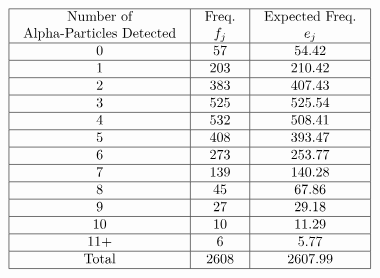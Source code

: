 \[ \begin{array}{|c|c|c|}
        \hline \begin{array}{c}
            \text{Number of} \\
            \text{Alpha-Particles Detected}
        \end{array} & \begin{array}{c}
            \text{Freq.} \\
            f_{j}
        \end{array} & \begin{array}{c}
            \text{Expected Freq.} \\
            e_{j}
        \end{array} \\
        \hline 0                          & 57                         & 54.42                      \\
        \hline 1                          & 203                        & 210.42                     \\
        \hline 2                          & 383                        & 407.43                     \\
        \hline 3                          & 525                        & 525.54                     \\
        \hline 4                          & 532                        & 508.41                     \\
        \hline 5                          & 408                        & 393.47                     \\
        \hline 6                          & 273                        & 253.77                     \\
        \hline 7                          & 139                        & 140.28                     \\
        \hline 8                          & 45                         & 67.86                      \\
        \hline 9                          & 27                         & 29.18                      \\
        \hline 10                         & 10                         & 11.29                      \\
        \hline 11+                        & 6                          & 5.77                       \\
        \hline \text{Total}               & 2608                       & 2607.99                    \\
        \hline
    \end{array} \]


